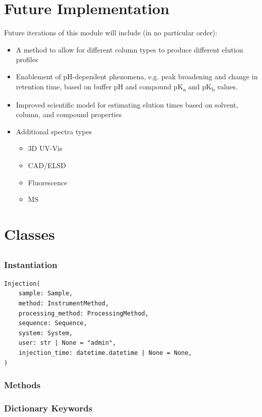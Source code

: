 \documentclass{article}
\newcommand{\btt}[1]{{\fontseries{b}\selectfont{\texttt{#1}}}}
\begin{document}
\section{Future Implementation}
Future iterations of this module will include (in no particular order):
\begin{itemize}
\item A method to allow for different column types to produce different elution profiles
\item Enablement of pH-dependent phenomena, e.g. peak broadening and change in retention time, based on buffer pH and compound pK\textsubscript{a} and pK\textsubscript{b} values.
\item Improved scientific model for estimating elution times based on solvent, column, and compound properties
\item Additional spectra types
\begin{itemize}
\item 3D UV-Vis
\item CAD/ELSD
\item Fluorescence
\item MS
\end{itemize}

\end{itemize}

\section{Classes}
\lstset{language=Python}
\lstset{style=pythonstyle}
\subsection{\btt{Injection}}

\subsubsection{Instantiation}
\begin{lstlisting}
Injection(
    sample: Sample,
    method: InstrumentMethod,
    processing_method: ProcessingMethod,
    sequence: Sequence,
    system: System,
    user: str | None = "admin",
    injection_time: datetime.datetime | None = None,
)
\end{lstlisting}
\subsubsection{Methods}

\subsubsection{Dictionary Keywords}
\end{document}
